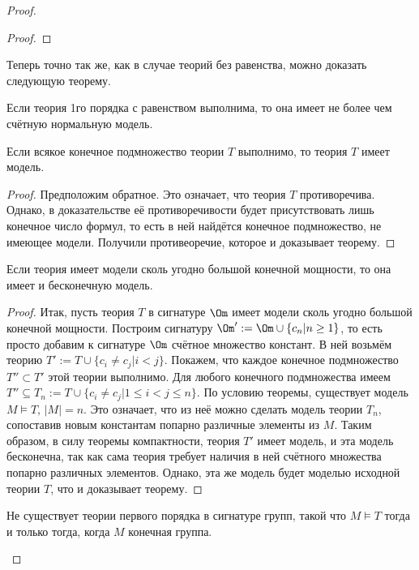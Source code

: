 \documentclass[a4paper,draft]{article}
\DeclareMathOperator{\PC}{PC}
\begin{document}
\begin{proof}
\begin{proof}
\end{proof}
Теперь точно так же, как в случае теорий без равенства, можно доказать следующую теорему.
\begin{theorem}
\equ{\vDash\ph\Ra\vdash_{\PC_{\Om}^=}\ph.}
\end{theorem}
\begin{imp}
Если теория 1го порядка с равенством выполнима, то она имеет не более чем счётную нормальную модель.
\end{imp}
\begin{theorem}
Если всякое конечное подмножество теории $T$ выполнимо, то теория $T$ имеет модель.
\end{theorem}
\begin{proof}
Предположим обратное. Это означает, что теория $T$ противоречива.
Однако, в доказательстве её противоречивости будет присутствовать лишь конечное число
формул, то есть в ней найдётся конечное подмножество, не имеющее модели. Получили противеоречие,
которое и доказывает теорему.
\end{proof}
\begin{imp}
Если теория имеет модели сколь угодно большой конечной мощности,
то она имеет и бесконечную модель.
\end{imp}
\begin{proof}
Итак, пусть теория $T$ в сигнатуре $\Om$ имеет модели сколь угодно большой конечной мощности.
Построим сигнатуру $\Om':=\Om\cup\{c_n|n\ge1\}$, то есть просто добавим к сигнатуре $\Om$
счётное множество констант. В ней возьмём теорию $T':=T\cup\{c_i\neq c_j|i<j\}.$ Покажем, что каждое
конечное подмножество $T''\subset T'$ этой теории выполнимо. Для любого конечного подмножества имеем
$T''\subseteq T_n:=T\cup\{c_i\neq c_j|1\le i<j\le n\}.$
По условию теоремы, существует модель $M\vDash T,\,|M|=n.$ Это означает,
что из неё можно сделать модель теории $T_n$, сопоставив новым константам попарно различные элементы из $M$.
Таким образом, в силу теоремы компактности, теория $T'$ имеет модель, и эта модель бесконечна, так
как сама теория требует наличия в ней счётного множества попарно различных элементов.
Однако, эта же модель будет моделью исходной теории $T$, что и доказывает теорему.
\end{proof}
\begin{ex}
Не существует теории первого порядка в сигнатуре групп, такой что
$M\vDash T$ тогда и только тогда, когда $M$ конечная группа.
\end{ex}

\end{proof}
\end{document}
